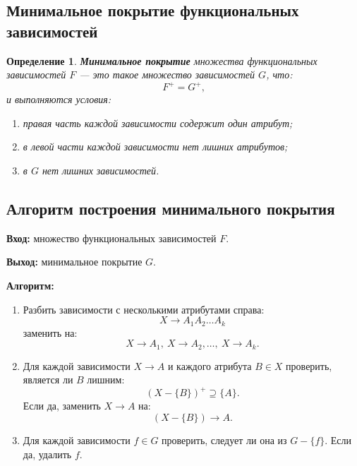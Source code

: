 \documentclass[12pt,a4paper]{article}
\newtheorem{definition}{Определение}[section]
\theoremstyle{remark}
\begin{document}
\subsection{Минимальное покрытие функциональных зависимостей}

\begin{definition}
\textbf{Минимальное покрытие} множества функциональных зависимостей $F$ --- это такое множество зависимостей $G$, что:
\[
F^+ = G^+,
\]
и выполняются условия:
\begin{enumerate}
    \item правая часть каждой зависимости содержит один атрибут;
    \item в левой части каждой зависимости нет лишних атрибутов;
    \item в $G$ нет лишних зависимостей.
\end{enumerate}
\end{definition}

\subsection{Алгоритм построения минимального покрытия}

\textbf{Вход:}
множество функциональных зависимостей $F$.

\textbf{Выход:}
минимальное покрытие $G$.

\textbf{Алгоритм:}
\begin{enumerate}
    \item Разбить зависимости с несколькими атрибутами справа:
    \[
    X \to A_1A_2\dots A_k
    \]
    заменить на:
    \[
    X \to A_1,\ X \to A_2,\dots,\ X \to A_k.
    \]

    \item Для каждой зависимости $X \to A$ и каждого атрибута $B \in X$ проверить, является ли $B$ лишним:
    \[
    (X - \{B\})^+ \supseteq \{A\}.
    \]
    Если да, заменить $X \to A$ на:
    \[
    (X - \{B\}) \to A.
    \]

    \item Для каждой зависимости $f \in G$ проверить, следует ли она из $G-\{f\}$.
    Если да, удалить $f$.
\end{enumerate}
\end{document}
